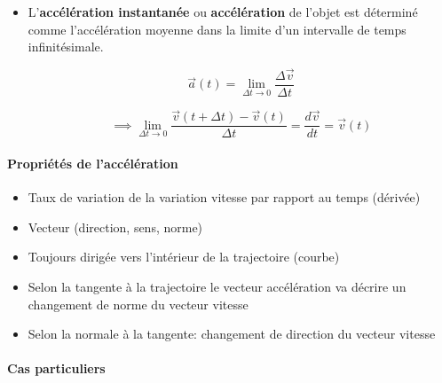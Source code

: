 \documentclass[
    11pt,
    a4paper,
    oneside,
    headinlcude, footinclude,
    twoside,
]{report}
\renewcommand{\vec}[1]{\overrightarrow{#1}}
\begin{document}
\begin{itemize}
\item L'\textbf{accélération instantanée} ou \textbf{accélération} de
l'objet est déterminé comme l'accélération moyenne dans la limite d'un
intervalle de temps infinitésimale.

\begin{equation}
\label{eq:2.21}
\vec a (t) = \lim_{\Delta t \to 0}  \frac{\Delta \vec v}{\Delta t}
\end{equation}

\begin{equation}
\implies \lim_{\Delta t \to 0} \frac{\vec v (t+\Delta t) - \vec v
(t)}{\Delta t} = \frac{d\vec v}{dt} = \vec v (t)
\end{equation}
\end{itemize}

\paragraph{Propriétés de l'accélération}

\begin{itemize}
\item Taux de variation de la variation vitesse par rapport au temps (dérivée)
\item Vecteur (direction, sens, norme)
\item Toujours dirigée vers l'intérieur de la trajectoire (courbe)
\item Selon la tangente à la trajectoire le vecteur accélération va
décrire un changement de norme du vecteur vitesse
\item Selon la normale à la tangente: changement de direction du vecteur
vitesse
\end{itemize}


\paragraph{Cas particuliers}
\label{par:cas_particuliers}
\end{document}
